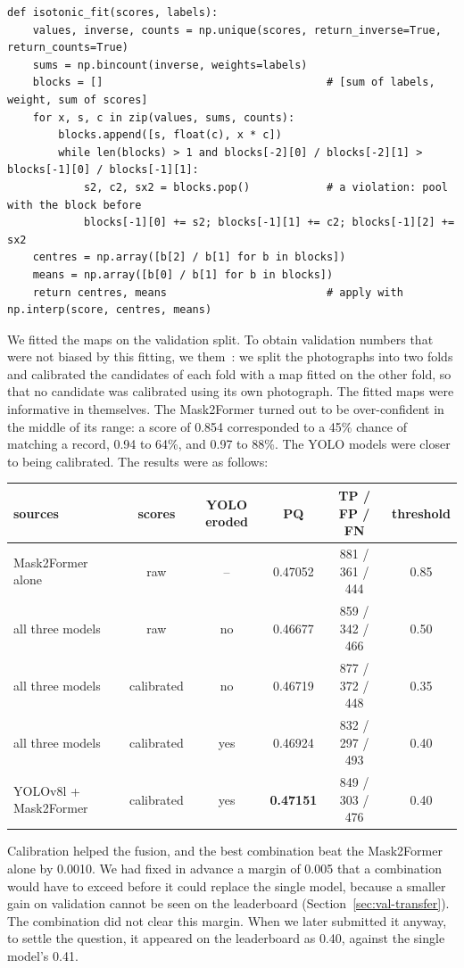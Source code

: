 \begin{lstlisting}[caption={Isotonic calibration by pool-adjacent-violators. Condensed from
\file{experiments/exp\_140\_three\_way\_ensemble/src/ensemble.py}.},label=lst:tta-isotonic]
def isotonic_fit(scores, labels):
    values, inverse, counts = np.unique(scores, return_inverse=True, return_counts=True)
    sums = np.bincount(inverse, weights=labels)
    blocks = []                                   # [sum of labels, weight, sum of scores]
    for x, s, c in zip(values, sums, counts):
        blocks.append([s, float(c), x * c])
        while len(blocks) > 1 and blocks[-2][0] / blocks[-2][1] > blocks[-1][0] / blocks[-1][1]:
            s2, c2, sx2 = blocks.pop()            # a violation: pool with the block before
            blocks[-1][0] += s2; blocks[-1][1] += c2; blocks[-1][2] += sx2
    centres = np.array([b[2] / b[1] for b in blocks])
    means = np.array([b[0] / b[1] for b in blocks])
    return centres, means                         # apply with np.interp(score, centres, means)
\end{lstlisting}

We fitted the maps on the validation split. To obtain validation numbers that were not biased by
this fitting, we  them~\citep{chernozhukov2018}: we split the photographs into two folds and calibrated
the candidates of each fold with a map fitted on the other fold, so that no candidate was calibrated
using its own photograph. The fitted maps were informative in themselves. The Mask2Former turned out
to be over-confident in the middle of its range: a score of 0.854 corresponded to a 45\% chance of
matching a record, 0.94 to 64\%, and 0.97 to 88\%. The YOLO models were closer to being calibrated.
The results were as follows:
\begin{center}\footnotesize
\setlength{\tabcolsep}{4pt}
\begin{tabular}{@{}lccccc@{}}
\toprule
sources & scores & YOLO eroded & PQ & TP / FP / FN & threshold \\
\midrule
Mask2Former alone & raw & -- & 0.47052 & 881 / 361 / 444 & 0.85 \\
all three models & raw & no & 0.46677 & 859 / 342 / 466 & 0.50 \\
all three models & calibrated & no & 0.46719 & 877 / 372 / 448 & 0.35 \\
all three models & calibrated & yes & 0.46924 & 832 / 297 / 493 & 0.40 \\
YOLOv8l + Mask2Former & calibrated & yes & \textbf{0.47151} & 849 / 303 / 476 & 0.40 \\
\bottomrule
\end{tabular}
\end{center}
Calibration helped the fusion, and the best combination beat the Mask2Former alone by 0.0010. We had
fixed in advance a margin of 0.005 that a combination would have to exceed before it could replace
the single model, because a smaller gain on validation cannot be seen on the leaderboard
(Section~\ref{sec:val-transfer}). The combination did not clear this margin. When we later submitted
it anyway, to settle the question, it appeared on the leaderboard as 0.40, against the single model's
0.41.


